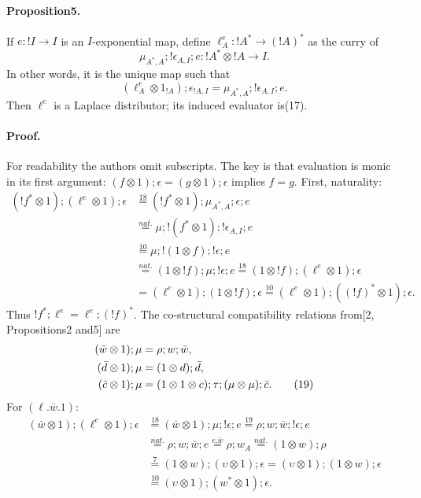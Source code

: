 \documentclass[10pt,a4paper]{amsart}
\newcommand{\by}[1]{\overset{\scriptscriptstyle #1}{=}}
\begin{document}
\paragraph{Proposition5.}
If $e:!I\to I$ is an $I$-exponential map, define
$\ell_A^e:!A^*\to(!A)^*$ as the curry of
\begin{equation}
\mu_{A^*,A};!\epsilon_{A,I};e:!A^*\otimes!A\to I.\tag{17}
\end{equation}
In other words, it is the unique map such that
\begin{equation}
(\ell_A^e\otimes1_{!A});\epsilon_{!A,I}
=\mu_{A^*,A};!\epsilon_{A,I};e.\tag{18}
\end{equation}
Then $\ell^e$ is a Laplace distributor; its induced evaluator is(17).
\paragraph{Proof.}
For readability the authors omit subscripts. The key is that evaluation is
monic in its first argument: $(f\otimes1);\epsilon=(g\otimes1);\epsilon$
implies $f=g$. First, naturality:
\begin{align*}
(!f^*\otimes1);(\ell^e\otimes1);\epsilon
&\by{18}(!f^*\otimes1);\mu_{A^*,A};\epsilon;e\\
&\by{nat.}\mu;!(f^*\otimes1);!\epsilon_{A,I};e\\
&\by{10}\mu;!(1\otimes f);!\epsilon;e\\
&\by{nat.}(1\otimes!f);\mu;!\epsilon;e
\by{18}(1\otimes!f);(\ell^e\otimes1);\epsilon\\
&=(\ell^e\otimes1);(1\otimes!f);\epsilon
\by{10}(\ell^e\otimes1);((!f)^*\otimes1);\epsilon.
\end{align*}
Thus $!f^*;\ell^e=\ell^e;(!f)^*$.
The co-structural compatibility relations from[2, Propositions2 and5] are
\begin{align}
(\bar w\otimes1);\mu&=\rho;w;\bar w,\notag\\
(\bar d\otimes1);\mu&=(1\otimes d);\bar d,\notag\\
(\bar c\otimes1);\mu&=(1\otimes1\otimes c);\tau;(\mu\otimes\mu);\bar c.\tag{19}
\end{align}
For $(\ell.\bar w.1)$:
\begin{align*}
(\bar w\otimes1);(\ell^e\otimes1);\epsilon
&\by{18}(\bar w\otimes1);\mu;!\epsilon;e
\by{19}\rho;w;\bar w;!\epsilon;e\\
&\by{nat.}\rho;w;\bar w;e
\by{e.\bar w}\rho;w_A
\by{nat.}(1\otimes w);\rho\\
&\by{7}(1\otimes w);(\upsilon\otimes1);\epsilon
=(\upsilon\otimes1);(1\otimes w);\epsilon\\
&\by{10}(\upsilon\otimes1);(w^*\otimes1);\epsilon.
\end{align*}
\end{document}
